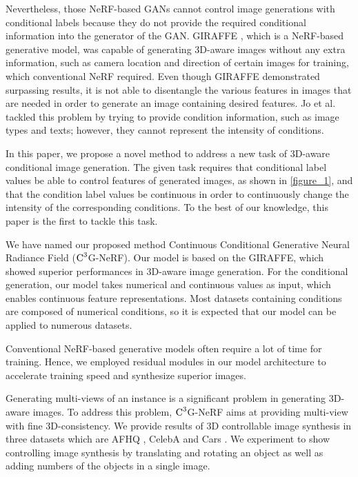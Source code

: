 \documentclass[nohyperref]{article}
\theoremstyle{plain}
\theoremstyle{definition}
\theoremstyle{remark}
\begin{document}
Nevertheless, those NeRF-based GANs cannot control image generations with conditional labels because they do not provide the required conditional information into the generator of the GAN. GIRAFFE \cite{niemeyer2021giraffe}, which is a NeRF-based generative model, was capable of generating 3D-aware images without any extra information, such as camera location and direction of certain images for training, which conventional NeRF required. Even though GIRAFFE demonstrated surpassing results, it is not able to disentangle the various features \cite{bengio2013representation, locatello2019challenging, nguyen2020blockgan} in images that are needed in order to generate an image containing desired features. Jo et al.  tackled this problem by trying to provide condition information, such as image types and texts; however, they cannot represent the intensity of conditions. 

In this paper, we propose a novel method to address a new task of 3D-aware conditional image generation. The given task requires that conditional label values \cite{cgan, odena2017conditional, cgan_proj} be able to control features of generated images, as shown in \cref{figure_1}, and that the condition label values be continuous in order to continuously change the intensity of the corresponding conditions. To the best of our knowledge, this paper is the ﬁrst to tackle this task. 

We have named our proposed method Continuous Conditional Generative Neural Radiance Field ($\textnormal{C}^{3}$G-NeRF). Our model is based on the GIRAFFE, which showed superior performances in 3D-aware image generation. For the conditional generation, our model takes numerical and continuous values as input, which enables continuous feature representations. Most datasets containing conditions are composed of numerical conditions, so it is expected that our model can be applied to numerous datasets. 

Conventional NeRF-based generative models often require a lot of time for training. Hence, we employed residual modules \cite{he2016deep, he2016identity} in our model architecture to accelerate training speed and synthesize superior images.

Generating multi-views of an instance is a significant problem in generating 3D-aware images. To address this problem, $\textnormal{C}^{3}$G-NeRF aims at providing multi-view with fine 3D-consistency. We provide results of 3D controllable image synthesis in three datasets which are AFHQ \cite{choi2020stargan}, CelebA \cite{liu2015deep} and Cars \cite{ashrafi_2022}. We experiment to show controlling image synthesis by translating and rotating an object as well as adding numbers of the objects in a single image. 
\end{document}
